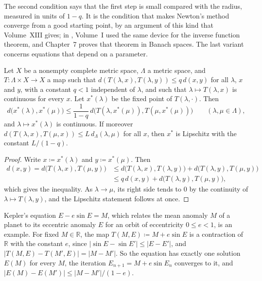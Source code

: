 The second condition says that the first step is small compared with the radius, measured in units of $1-q$. It is the condition that makes Newton's method converge from a good starting point, by an argument of this kind that Volume~XIII gives; in , Volume~I used the same device for the inverse function theorem, and Chapter~7 proves that theorem in Banach spaces. The last variant concerns equations that depend on a parameter.

\begin{theorem}
\label{thm:fixed-point-parameter}
Let $X$ be a nonempty complete metric space, $\Lambda$ a metric space, and $T\colon\Lambda\times X\to X$ a map such that $d(T(\lambda,x),T(\lambda,y))\le q\,d(x,y)$ for all $\lambda$, $x$ and $y$, with a constant $q<1$ independent of $\lambda$, and such that $\lambda\mapsto T(\lambda,x)$ is continuous for every $x$. Let $x^*(\lambda)$ be the fixed point of $T(\lambda,\cdot)$. Then
\[
d\bigl(x^*(\lambda),x^*(\mu)\bigr)\le\frac1{1-q}\,d\bigl(T(\lambda,x^*(\mu)),T(\mu,x^*(\mu))\bigr)\qquad(\lambda,\mu\in\Lambda),
\]
and $\lambda\mapsto x^*(\lambda)$ is continuous. If moreover $d(T(\lambda,x),T(\mu,x))\le L\,d_\Lambda(\lambda,\mu)$ for all $x$, then $x^*$ is Lipschitz with the constant $L/(1-q)$.
\end{theorem}

\begin{proof}
Write $x\coloneqq x^*(\lambda)$ and $y\coloneqq x^*(\mu)$. Then
\begin{align*}
d(x,y)=d\bigl(T(\lambda,x),T(\mu,y)\bigr)&\le d\bigl(T(\lambda,x),T(\lambda,y)\bigr)+d\bigl(T(\lambda,y),T(\mu,y)\bigr)\\
&\le q\,d(x,y)+d\bigl(T(\lambda,y),T(\mu,y)\bigr),
\end{align*}
which gives the inequality. As $\lambda\to\mu$, its right side tends to $0$ by the continuity of $\lambda\mapsto T(\lambda,y)$, and the Lipschitz statement follows at once.
\end{proof}

Kepler's equation $E-e\sin E=M$, which relates the mean anomaly $M$ of a planet to its eccentric anomaly $E$ for an orbit of eccentricity $0\le e<1$, is an example. For fixed $M\in\mathbb R$, the map $T(M,E)\coloneqq M+e\sin E$ is a contraction of $\mathbb R$ with the constant $e$, since $|\sin E-\sin E'|\le|E-E'|$, and $|T(M,E)-T(M',E)|=|M-M'|$. So the equation has exactly one solution $E(M)$ for every $M$, the iteration $E_{n+1}=M+e\sin E_n$ converges to it, and $|E(M)-E(M')|\le|M-M'|/(1-e)$.

